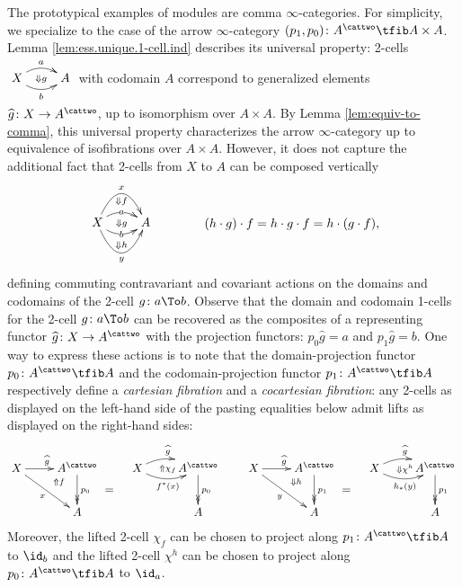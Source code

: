 \documentclass[12pt,reqno]{amsart}
\theoremstyle{plain}
\theoremstyle{definition}
\theoremstyle{remark}
\numberwithin{equation}{subsection}
\begin{document}
The prototypical examples of modules are comma $\infty$-categories. For simplicity, we specialize to the case of the arrow $\infty$-category $(p_1,p_0)\colon A^\cattwo \tfib A \times A$. Lemma \ref{lem:ess.unique.1-cell.ind} describes its universal property: 2-cells $\xymatrix{X \ar@/^2ex/[r]^a \ar@/_2ex/[r]_b \ar@{}[r]|{\Downarrow g} & A}$ with codomain $A$ correspond to generalized elements $\hat{g} \colon X \to A^\cattwo$, up to isomorphism over $A \times A$. By Lemma \ref{lem:equiv-to-comma}, this universal property characterizes the arrow $\infty$-category up to equivalence of isofibrations over $A \times A$. However, it does not capture the additional fact that 2-cells from $X$ to $A$ can be composed vertically
\[\vcenter{\xymatrix@R=30pt{  X \ar@/^5.5ex/[r]^x_{\Downarrow f} \ar@/_5.5ex/[r]_y^{\Downarrow h} \ar@/^2ex/[r]|a \ar@/_2ex/[r]|b \ar@{}[r]|{\Downarrow g}& A}} \qquad \qquad (h \cdot g) \cdot f = h \cdot g \cdot f = h \cdot (g \cdot f),\] 
 defining commuting contravariant and covariant actions on the domains and codomains of the 2-cell $g \colon a \To b$. 
Observe that the domain and codomain 1-cells for the 2-cell $g \colon a \To b$ can be recovered as the composites of a representing functor $\hat{g} \colon X \to A^\cattwo$ with the projection functors: $p_0 \hat{g} = a$ and $p_1 \hat{g} = b$.
One way to express these actions is to note that the domain-projection functor $p_0 \colon A^\cattwo \tfib A$ and the codomain-projection functor $p_1 \colon A^\cattwo \tfib A$ respectively define a \emph{cartesian fibration} and a \emph{cocartesian fibration}:  any 2-cells as displayed on the left-hand side of the pasting equalities below admit lifts as displayed on the right-hand sides:
\[ \vcenter{\xymatrix{ X \ar[r]^{\hat{g}} \ar[dr]_x & A^\cattwo \ar@{->>}[d]^{p_0} \ar@{}[dl]|(.3){\Uparrow f} \ar@{}[dr]|{\displaystyle ~=} & X \ar@/^2ex/[r]^{\hat{g}} \ar@/_2ex/[r]_{f^*(x)} \ar@{}[r]|{\Uparrow \chi_{f}} & A^\cattwo \ar@{->>}[d]^{p_0}  \\ & A & & A}}  \qquad \vcenter{\xymatrix{ X \ar[r]^{\hat{g}} \ar[dr]_y & A^\cattwo \ar@{->>}[d]^{p_1} \ar@{}[dl]|(.3){\Downarrow h} \ar@{}[dr]|{\displaystyle ~= } & X \ar@/^2ex/[r]^{\hat{g}} \ar@/_2ex/[r]_{h_*(y)} \ar@{}[r]|{\Downarrow \chi^{h}} & A^\cattwo \ar@{->>}[d]^{p_1}  \\ & A & & A}}
\]
Moreover, the lifted 2-cell $\chi_f$ can be chosen to project along $p_1 \colon A^\cattwo \tfib A$ to $\id_b$ and the lifted 2-cell $\chi^h$ can be chosen to project along $p_0 \colon A^\cattwo \tfib A$ to $\id_a$. 
\end{document}
